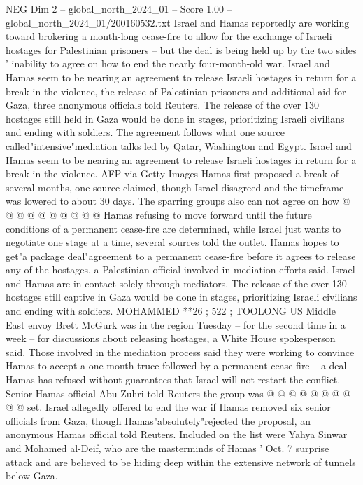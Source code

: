 \begin{textsample}{NEG Dim 2 – global\_north\_2024\_01 – Score 1.00 – global\_north\_2024\_01/200160532.txt}  \label{ex:f2_neg_243}
Israel and Hamas reportedly are working toward brokering a month-long cease-fire to allow for the exchange of Israeli hostages for Palestinian prisoners -- but the deal is being held up by the two sides ' inability to agree on how to end the nearly four-month-old war.
Israel and Hamas seem to be nearing an agreement to release Israeli hostages in return for a break in the violence, the release of Palestinian prisoners and additional aid for Gaza, three anonymous officials told Reuters.
The release of the over 130 hostages still held in Gaza would be done in stages, prioritizing Israeli civilians and ending with soldiers.
The agreement follows what one source called"intensive"mediation talks led by Qatar, Washington and Egypt.
Israel and Hamas seem to be nearing an agreement to release Israeli hostages in return for a break in the violence.
AFP via Getty Images Hamas first proposed a break of several months, one source claimed, though Israel disagreed and the timeframe was lowered to about 30 days.
The sparring groups also can not agree on how @ @ @ @ @ @ @ @ @ @ Hamas refusing to move forward until the future conditions of a permanent cease-fire are determined, while Israel just wants to negotiate one stage at a time, several sources told the outlet.
Hamas hopes to get"a package deal"agreement to a permanent cease-fire before it agrees to release any of the hostages, a Palestinian official involved in mediation efforts said.
Israel and Hamas are in contact solely through mediators.
The release of the over 130 hostages still captive in Gaza would be done in stages, prioritizing Israeli civilians and ending with soldiers.
MOHAMMED **26 ; 522 ; TOOLONG US Middle East envoy Brett McGurk was in the region Tuesday -- for the second time in a week -- for discussions about releasing hostages, a White House spokesperson said.
Those involved in the mediation process said they were working to convince Hamas to accept a one-month truce followed by a permanent cease-fire -- a deal Hamas has refused without guarantees that Israel will not restart the conflict.
Senior Hamas official Abu Zuhri told Reuters the group was @ @ @ @ @ @ @ @ @ @ set.
Israel allegedly offered to end the war if Hamas removed six senior officials from Gaza, though Hamas"absolutely"rejected the proposal, an anonymous Hamas official told Reuters.
Included on the list were Yahya Sinwar and Mohamed al-Deif, who are the masterminds of Hamas ' Oct. 7 surprise attack and are believed to be hiding deep within the extensive network of tunnels below Gaza.

\end{textsample}
